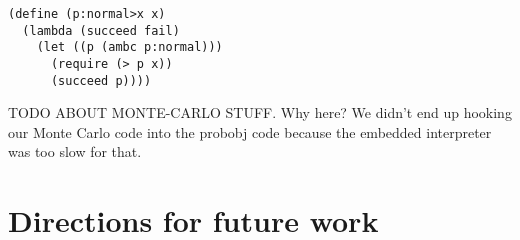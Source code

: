 \documentclass{article}
\begin{document}
\begin{lstlisting}
(define (p:normal>x x)
  (lambda (succeed fail)
    (let ((p (ambc p:normal)))
      (require (> p x))
      (succeed p))))
\end{lstlisting}

TODO ABOUT MONTE-CARLO STUFF.
Why here? We didn't end up hooking our Monte Carlo code into the probobj code
because the embedded interpreter was too slow for that.
\section{Directions for future work}
\end{document}
